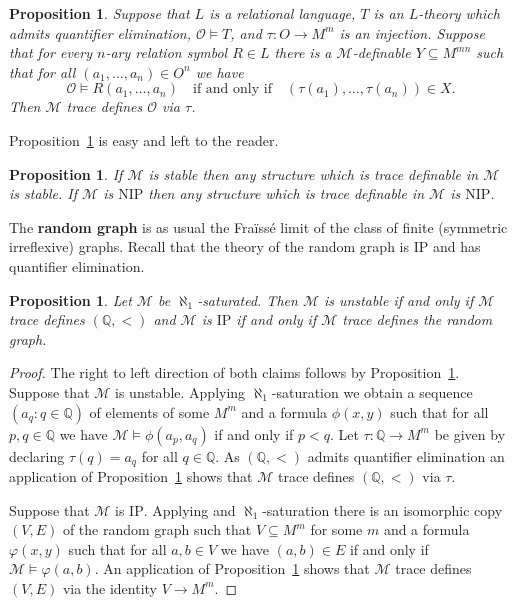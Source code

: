 \documentclass[bibalpha]{amsart}
\newtheorem{prop}[theorem]{Proposition}
\theoremstyle{definition}
\theoremstyle{remark}
\newcommand{\nip}{\mathrm{NIP}}
\newcommand{\Sa}[1]{\ensuremath{\mathscr{#1}}}
\newcommand{\Q}{\mathbb{Q}}
\begin{document}
\begin{prop}
\label{prop:qe}
Suppose that $L$ is a relational language, $T$ is an $L$-theory which admits quantifier elimination, $\Sa O \models T$, and $\tau : O \to M^m$ is an injection.
Suppose that for every $n$-ary relation symbol $R \in L$ there is a $\Sa M$-definable $Y \subseteq M^{mn}$ such that for all $(a_1,\ldots,a_n) \in O^n$ we have
$$ \Sa O \models R(a_1,\ldots,a_n) \quad \text{if and only if} \quad (\tau(a_1),\ldots,\tau(a_n)) \in X. $$
Then $\Sa M$ trace defines $\Sa O$ via $\tau$.
\end{prop}

\noindent
Proposition~\ref{prop:trace} is easy and left to the reader.

\begin{prop}
\label{prop:trace}
If $\Sa M$ is stable then any structure which is trace definable in $\Sa M$ is stable.
If $\Sa M$ is $\nip$ then any structure which is trace definable in $\Sa M$ is $\nip$.
\end{prop}


\noindent
The \textbf{random graph} is as usual the Fra\"iss\'e limit of the class of finite (symmetric irreflexive) graphs.
Recall that the theory of the random graph is $\mathrm{IP}$ and has quantifier elimination.

\begin{prop}
\label{prop:trace-0}
Let $\Sa M$ be $\aleph_1$-saturated.
Then $\Sa M$ is unstable if and only if $\Sa M$ trace defines $(\Q,<)$ and $\Sa M$ is $\mathrm{IP}$ if and only if $\Sa M$ trace defines the random graph.
\end{prop}

\begin{proof}
The right to left direction of both claims follows by Proposition~\ref{prop:trace}.
Suppose that $\Sa M$ is unstable.
Applying $\aleph_1$-saturation we obtain a sequence $(a_q : q \in \Q)$ of elements of some $M^m$ and a formula $\phi(x,y)$ such that for all $p,q \in \Q$ we have $\Sa M \models \phi(a_p,a_q)$ if and only if $p < q$.
Let $\tau : \Q \to M^m$ be given by declaring $\tau(q) = a_q$ for all $q \in \Q$.
As $(\Q,<)$ admits quantifier elimination an application of Proposition~\ref{prop:qe} shows that $\Sa M$ trace defines $(\Q,<)$ via $\tau$.
\newline

\noindent
Suppose that $\Sa M$ is $\mathrm{IP}$.
Applying \cite[Lemma 2.2]{Laskowski-shelah-karp} and $\aleph_1$-saturation there is an isomorphic copy $(V,E)$ of the random graph such that $V \subseteq M^m$ for some $m$ and a formula $\varphi(x,y)$ such that for all $a,b \in V$ we have $(a,b) \in E$ if and only if $\Sa M \models \varphi(a,b)$.
An application of Proposition~\ref{prop:qe} shows that $\Sa M$ trace defines $(V,E)$ via the identity $V \to M^m$.
\end{proof}
\end{document}
